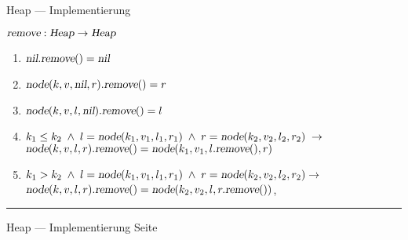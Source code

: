 \documentclass{slides}
\newcounter{mypage}
\begin{document}

\begin{slide}{}
\normalsize

\begin{center}
Heap --- Implementierung
\end{center}
\vspace*{0.5cm}

\footnotesize
$\textsl{remove}: \textsl{Heap} \rightarrow \textsl{Heap}$
\begin{enumerate}
\item $\textsl{nil}.\textsl{remove}() = \textsl{nil}$
\item $\textsl{node}(k,v,\textsl{nil},r).\textsl{remove}() = r$
\item $\textsl{node}(k,v,l,\textsl{nil}).\textsl{remove}() = l$
\item $k_1 \leq k_2 \;\wedge\; l = \textsl{node}(k_1,v_1,l_1,r_1) \;\wedge\; r =
      \textsl{node}(k_2,v_2,l_2,r_2) \;\rightarrow$ \\[0.3cm] 
      \hspace*{0.3cm} 
      $\textsl{node}(k,v,l,r).\textsl{remove}() = \textsl{node}(k_1,v_1,l.\textsl{remove}(),r)$
\item $k_1 > k_2 \;\wedge\; l = \textsl{node}(k_1,v_1,l_1,r_1) \;\wedge\; r = \textsl{node}(k_2,v_2,l_2,r_2) \rightarrow$ \\[0.3cm]
      \hspace*{0.3cm} 
      $\textsl{node}(k,v,l,r).\textsl{remove}() = \textsl{node}(k_2,v_2,l,r.\textsl{remove}())$,
\end{enumerate}


\vspace*{\fill}
\tiny \addtocounter{mypage}{1}
\rule{17cm}{1mm}
Heap --- Implementierung \hspace*{\fill} Seite 
\end{slide}

\end{document}
